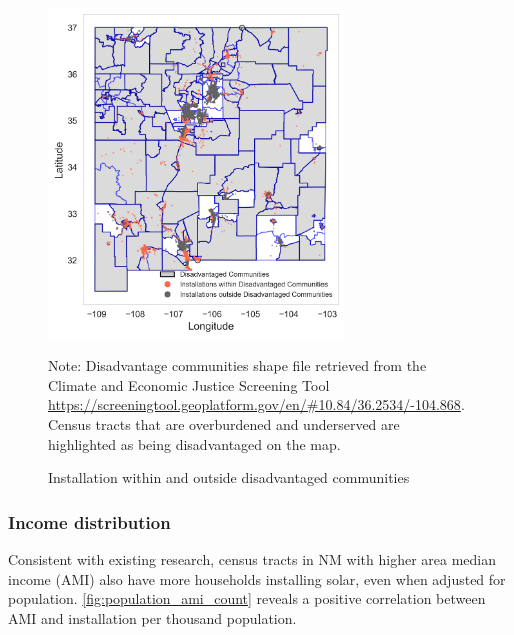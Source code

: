 \documentclass[12pt,twoside,letterpaper]{article}
\begin{document}
\begin{figure}[H]
    \centering
\includegraphics[width=0.7\textwidth]{figures/disadvantage_installation.png}
    \caption{Installation within and outside disadvantaged communities}
    \label{fig:disadvantage_installation}
        \begin{flushleft}
        \footnotesize Note: Disadvantage communities shape file retrieved from the Climate and Economic Justice Screening Tool \url{https://screeningtool.geoplatform.gov/en/#10.84/36.2534/-104.868}. Census tracts that are overburdened and underserved are highlighted as being disadvantaged on the map.
    \end{flushleft}
\end{figure}


\subsubsection{Income distribution}

Consistent with existing research, census tracts in NM with higher area median income (AMI) also have more households installing solar, even when adjusted for population. \autoref{fig:population_ami_count} reveals a positive correlation between AMI and installation per thousand population.
\end{document}
